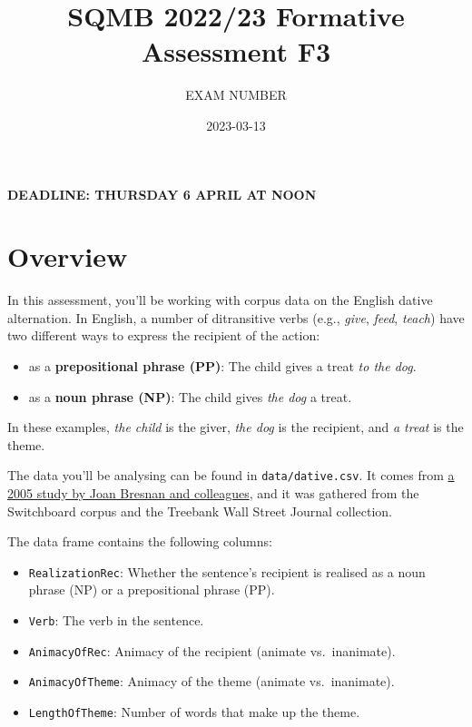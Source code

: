 \documentclass[
]{article}
\title{SQMB 2022/23 Formative Assessment F3}
\author{EXAM NUMBER}
\date{2023-03-13}
\providecommand{\tightlist}{%
  \setlength{\itemsep}{0pt}\setlength{\parskip}{0pt}}
\begin{document}
\maketitle

\textbf{DEADLINE: THURSDAY 6 APRIL AT NOON}

\hypertarget{overview}{%
\section{Overview}\label{overview}}

In this assessment, you'll be working with corpus data on the English
dative alternation. In English, a number of ditransitive verbs (e.g.,
\emph{give}, \emph{feed}, \emph{teach}) have two different ways to
express the recipient of the action:

\begin{itemize}
\tightlist
\item
  as a \textbf{prepositional phrase (PP)}: The child gives a treat
  \emph{to the dog}.
\item
  as a \textbf{noun phrase (NP)}: The child gives \emph{the dog} a
  treat.
\end{itemize}

In these examples, \emph{the child} is the giver, \emph{the dog} is the
recipient, and \emph{a treat} is the theme.

The data you'll be analysing can be found in \texttt{data/dative.csv}.
It comes from \href{https://web.stanford.edu/~bresnan/qs-submit.pdf}{a
2005 study by Joan Bresnan and colleagues}, and it was gathered from the
Switchboard corpus and the Treebank Wall Street Journal collection.

The data frame contains the following columns:

\begin{itemize}
\tightlist
\item
  \texttt{RealizationRec}: Whether the sentence's recipient is realised
  as a noun phrase (NP) or a prepositional phrase (PP).
\item
  \texttt{Verb}: The verb in the sentence.
\item
  \texttt{AnimacyOfRec}: Animacy of the recipient (animate
  vs.~inanimate).
\item
  \texttt{AnimacyOfTheme}: Animacy of the theme (animate vs.~inanimate).
\item
  \texttt{LengthOfTheme}: Number of words that make up the theme.
\end{itemize}
\end{document}

